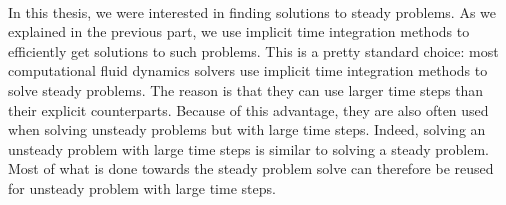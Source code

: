   \paragraph{}
  In this thesis, we were interested in finding solutions to steady problems.
  As we explained in the previous part, we use implicit time integration methods to efficiently get solutions to such problems.
  This is a pretty standard choice: most computational fluid dynamics solvers use implicit time integration methods to solve steady problems.
  The reason is that they can use larger time steps than their explicit counterparts.
  Because of this advantage, they are also often used when solving unsteady problems but with large time steps.
  Indeed, solving an unsteady problem with large time steps is similar to solving a steady problem.
  Most of what is done towards the steady problem solve can therefore be reused for unsteady problem with large time steps.

